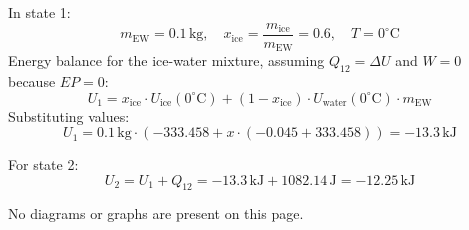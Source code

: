 In state 1:  
\[
m_{\text{EW}} = 0.1 \, \text{kg}, \quad x_{\text{ice}} = \frac{m_{\text{ice}}}{m_{\text{EW}}} = 0.6, \quad T = 0^\circ\text{C}
\]  
Energy balance for the ice-water mixture, assuming \( Q_{12} = \Delta U \) and \( W = 0 \) because \( EP = 0 \):  
\[
U_1 = x_{\text{ice}} \cdot U_{\text{ice}}(0^\circ\text{C}) + (1 - x_{\text{ice}}) \cdot U_{\text{water}}(0^\circ\text{C}) \cdot m_{\text{EW}}
\]  
Substituting values:  
\[
U_1 = 0.1 \, \text{kg} \cdot (-333.458 + x \cdot (-0.045 + 333.458)) = -13.3 \, \text{kJ}
\]  

For state 2:  
\[
U_2 = U_1 + Q_{12} = -13.3 \, \text{kJ} + 1082.14 \, \text{J} = -12.25 \, \text{kJ}
\]  

No diagrams or graphs are present on this page.
